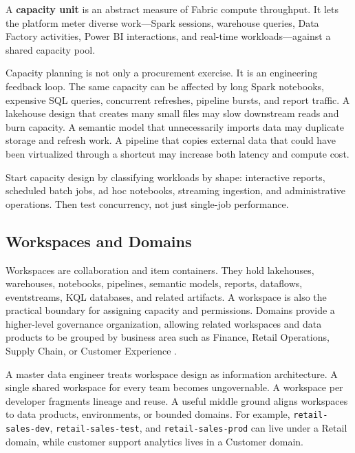 \begin{definitionbox}
A \textbf{capacity unit} is an abstract measure of Fabric compute throughput. It lets the platform meter diverse work---Spark sessions, warehouse queries, Data Factory activities, Power BI interactions, and real-time workloads---against a shared capacity pool.
\end{definitionbox}

Capacity planning is not only a procurement exercise. It is an engineering feedback loop. The same capacity can be affected by long Spark notebooks, expensive SQL queries, concurrent refreshes, pipeline bursts, and report traffic. A lakehouse design that creates many small files may slow downstream reads and burn capacity. A semantic model that unnecessarily imports data may duplicate storage and refresh work. A pipeline that copies external data that could have been virtualized through a shortcut may increase both latency and compute cost.

\begin{tipbox}
Start capacity design by classifying workloads by shape: interactive reports, scheduled batch jobs, ad hoc notebooks, streaming ingestion, and administrative operations. Then test concurrency, not just single-job performance.
\end{tipbox}

\subsection{Workspaces and Domains}
Workspaces are collaboration and item containers. They hold lakehouses, warehouses, notebooks, pipelines, semantic models, reports, dataflows, eventstreams, KQL databases, and related artifacts. A workspace is also the practical boundary for assigning capacity and permissions. Domains provide a higher-level governance organization, allowing related workspaces and data products to be grouped by business area such as Finance, Retail Operations, Supply Chain, or Customer Experience \cite{microsoftDomains}.

A master data engineer treats workspace design as information architecture. A single shared workspace for every team becomes ungovernable. A workspace per developer fragments lineage and reuse. A useful middle ground aligns workspaces to data products, environments, or bounded domains. For example, \texttt{retail-sales-dev}, \texttt{retail-sales-test}, and \texttt{retail-sales-prod} can live under a Retail domain, while customer support analytics lives in a Customer domain.

